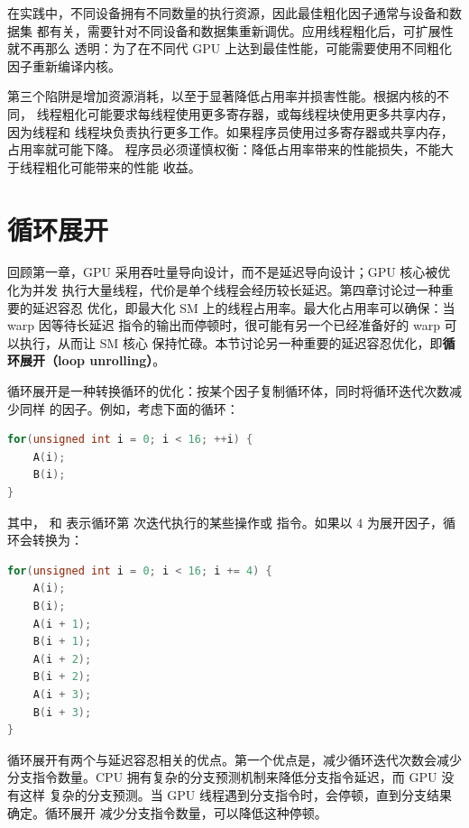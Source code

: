 在实践中，不同设备拥有不同数量的执行资源，因此最佳粗化因子通常与设备和数据集
都有关，需要针对不同设备和数据集重新调优。应用线程粗化后，可扩展性就不再那么
透明：为了在不同代 GPU 上达到最佳性能，可能需要使用不同粗化因子重新编译内核。

第三个陷阱是增加资源消耗，以至于显著降低占用率并损害性能。根据内核的不同，
线程粗化可能要求每线程使用更多寄存器，或每线程块使用更多共享内存，因为线程和
线程块负责执行更多工作。如果程序员使用过多寄存器或共享内存，占用率就可能下降。
程序员必须谨慎权衡：降低占用率带来的性能损失，不能大于线程粗化可能带来的性能
收益。

\section{循环展开}
\label{sec:loop-unrolling}

回顾第一章，GPU 采用吞吐量导向设计，而不是延迟导向设计；GPU 核心被优化为并发
执行大量线程，代价是单个线程会经历较长延迟。第四章讨论过一种重要的延迟容忍
优化，即最大化 SM 上的线程占用率。最大化占用率可以确保：当 warp 因等待长延迟
指令的输出而停顿时，很可能有另一个已经准备好的 warp 可以执行，从而让 SM 核心
保持忙碌。本节讨论另一种重要的延迟容忍优化，即\textbf{循环展开（loop unrolling）}。

循环展开是一种转换循环的优化：按某个因子复制循环体，同时将循环迭代次数减少同样
的因子。例如，考虑下面的循环：

\noindent\begin{minipage}{\linewidth}
\begin{lstlisting}[language=C++]
for(unsigned int i = 0; i < 16; ++i) {
    A(i);
    B(i);
}
\end{lstlisting}
\end{minipage}

其中， 和  表示循环第  次迭代执行的某些操作或
指令。如果以 4 为展开因子，循环会转换为：

\begin{lstlisting}[language=C++]
for(unsigned int i = 0; i < 16; i += 4) {
    A(i);
    B(i);
    A(i + 1);
    B(i + 1);
    A(i + 2);
    B(i + 2);
    A(i + 3);
    B(i + 3);
}
\end{lstlisting}

循环展开有两个与延迟容忍相关的优点。第一个优点是，减少循环迭代次数会减少
分支指令数量。CPU 拥有复杂的分支预测机制来降低分支指令延迟，而 GPU 没有这样
复杂的分支预测。当 GPU 线程遇到分支指令时，会停顿，直到分支结果确定。循环展开
减少分支指令数量，可以降低这种停顿。

